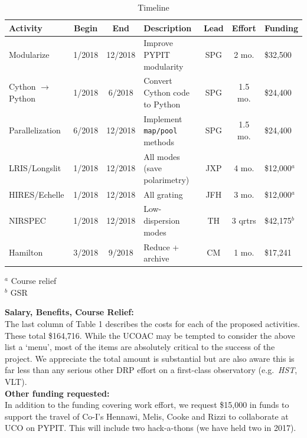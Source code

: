 \documentclass[12pt,preprint]{aastex}
\begin{document}
\clearpage

{\footnotesize

\begin{table}[ht]
\begin{center}
\caption{Timeline \label{tab:timeline}}
\end{center}
\begin{tabular}{lcclccl}
\hline 
Activity & Begin & End & Description & Lead & Effort & Funding \\
\hline 
Modularize & 1/2018 & 12/2018 & Improve PYPIT modularity & SPG & 2 mo. & \$32,500 \\
%
Cython $\to$ Python & 1/2018 & 6/2018 & Convert Cython code to Python & SPG & 1.5 mo. & \$24,400 \\
%
Parallelization & 6/2018 & 12/2018 & Implement {\tt map/pool} methods & SPG & 1.5 mo. & \$24,400 \\
LRIS/Longslit & 1/2018 & 12/2018 & All modes (save polarimetry) & JXP & 4 mo. & 
\$12,000$^a$ \\
HIRES/Echelle & 1/2018 & 12/2018 & All grating & JFH & 3 mo. & \$12,000$^a$ \\
NIRSPEC & 1/2018 & 12/2018 & Low-dispersion modes & TH & 3 qrtrs & \$42,175$^b$\\
Hamilton & 3/2018 & 9/2018 & Reduce + archive & CM & 1 mo. & \$17,241 \\
\hline 
\end{tabular} 
${}^a$ Course relief \\
${}^b$ GSR\\
\end{table} 

}

\noindent
{\bf Salary, Benefits, Course Relief:} \\
The last column of Table 1 describes the costs
for each of the proposed activities.  These total
\$164,716.  While the UCOAC may be tempted to 
consider the above list a `menu', most of the items
are absolutely critical to the success of the
project.   We appreciate the total amount is substantial
but are also aware this is far less than any
serious other DRP effort on a first-class observatory
(e.g.\ {\it HST}, VLT).  \\

\noindent
{\bf Other funding requested:} \\
In addition to the funding covering work effort, we request
\$15,000 in funds to support the travel of Co-I's Hennawi, Melis,
Cooke and Rizzi to collaborate at UCO on PYPIT.  This will include
two hack-a-thons (we have held two in 2017).
\end{document}
